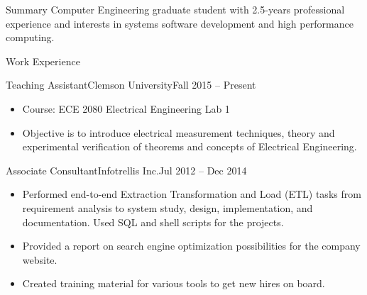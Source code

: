 \documentclass[]{SriramMadhivanan}
\begin{document}
	\makeheader
	
	\begin{cvsection}{Summary}
	 Computer Engineering graduate student with 2.5-years professional experience and interests in systems software development and high performance computing.

	\end{cvsection}

	\begin{cvsection}{Work Experience}
		\begin{cvsubsection}{Teaching Assistant}{Clemson University}{Fall 2015 -- Present}		
			\begin{itemize}
				\item Course: ECE 2080 Electrical Engineering Lab 1
				\item Objective is to introduce electrical measurement techniques, theory and experimental verification of theorems and concepts of Electrical Engineering.
			\end{itemize}
		\end{cvsubsection}
		
		
		\begin{cvsubsection}{Associate Consultant}{Infotrellis Inc.}{Jul 2012 -- Dec 2014}		
			\begin{itemize}
				\item Performed end-to-end Extraction Transformation and Load (ETL) tasks from requirement analysis to system study, design, implementation, and documentation. Used SQL and shell scripts for the projects.
				\item Provided a report on search engine optimization possibilities for the company website.
				\item Created training material for various tools to get new hires on board.				
			\end{itemize}
		\end{cvsubsection}
	\end{cvsection}
	
\end{document}
